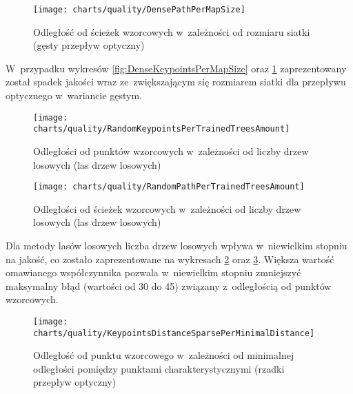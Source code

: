       \begin{figure}[!ht]
        \centering
        \texttt{[image: charts/quality/DensePathPerMapSize]}
        \caption[Odległość od ścieżek wzorcowych w~zależności od rozmiaru siatki]
                {Odległość od ścieżek wzorcowych w~zależności od rozmiaru siatki (gęsty przepływ optyczny)}
        \label{fig:DensePathPerMapSize}
      \end{figure}

    W~przypadku wykresów \ref{fig:DenseKeypointsPerMapSize} oraz \ref{fig:DensePathPerMapSize} zaprezentowany został spadek jakości wraz ze~zwiększającym się rozmiarem siatki dla przepływu optycznego w~wariancie gęstym.

    \newpage
      \begin{figure}[!ht]
        \centering
        \texttt{[image: charts/quality/RandomKeypointsPerTrainedTreesAmount]}
        \caption[Odległości od punktów wzorcowych w~zależności od liczby drzew losowych]
                {Odległości od punktów wzorcowych w~zależności od liczby drzew losowych (las drzew losowych)}
        \label{fig:RandomKeypointsPerTrainedTreesAmount}
      \end{figure}

      \begin{figure}[!ht]
        \centering
        \texttt{[image: charts/quality/RandomPathPerTrainedTreesAmount]}
        \caption[Odległości od ścieżek wzorcowych w~zależności od liczby drzew losowych]
                {Odległości od ścieżek wzorcowych w~zależności od liczby drzew losowych (las drzew losowych)}
        \label{fig:RandomPathPerTrainedTreesAmount}
      \end{figure}

    Dla metody lasów losowych liczba drzew losowych wpływa w~niewielkim stopniu na jakość, co zostało zaprezentowane na wykresach \ref{fig:RandomKeypointsPerTrainedTreesAmount} oraz \ref{fig:RandomPathPerTrainedTreesAmount}. Większa wartość omawianego współczynnika pozwala w~niewielkim stopniu zmniejszyć maksymalny błąd (wartości od 30 do 45) związany z~odległością od punktów wzorcowych.

    \newpage
      \begin{figure}[!ht]
        \centering
        \texttt{[image: charts/quality/KeypointsDistanceSparsePerMinimalDistance]}
        \caption[Odległość od punktu wzorcowego w~zależności od minimalnej odległości pomiędzy punktami
                 charakterystycznymi]
                {Odległość od punktu wzorcowego w~zależności od minimalnej odległości pomiędzy punktami
                 charakterystycznymi (rzadki przepływ optyczny)}
        \label{fig:SpecialisedSparseKeypointsDistance}
      \end{figure}

